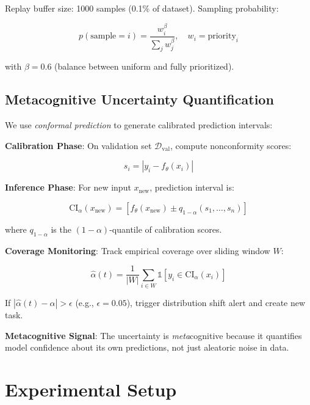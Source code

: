 \documentclass[journal]{IEEEtran}
\begin{document}
Replay buffer size: 1000 samples (0.1\% of dataset). Sampling probability:

\begin{equation}
p(\text{sample} = i) = \frac{w_i^\beta}{\sum_j w_j^\beta}, \quad w_i = \text{priority}_i
\end{equation}

with $\beta = 0.6$ (balance between uniform and fully prioritized).

\subsection{Metacognitive Uncertainty Quantification}

We use \textit{conformal prediction} \cite{shafer2008tutorial} to generate calibrated prediction intervals:

\textbf{Calibration Phase}: On validation set $\mathcal{D}_{\text{val}}$, compute nonconformity scores:

\begin{equation}
s_i = |y_i - f_\theta(x_i)|
\end{equation}

\textbf{Inference Phase}: For new input $x_{\text{new}}$, prediction interval is:

\begin{equation}
\text{CI}_\alpha(x_{\text{new}}) = \left[ f_\theta(x_{\text{new}}) \pm q_{1-\alpha}(s_1, \ldots, s_n) \right]
\end{equation}

where $q_{1-\alpha}$ is the $(1-\alpha)$-quantile of calibration scores.

\textbf{Coverage Monitoring}: Track empirical coverage over sliding window $W$:

\begin{equation}
\hat{\alpha}(t) = \frac{1}{|W|} \sum_{i \in W} \mathbb{1}[y_i \in \text{CI}_\alpha(x_i)]
\end{equation}

If $|\hat{\alpha}(t) - \alpha| > \epsilon$ (e.g., $\epsilon = 0.05$), trigger distribution shift alert and create new task.

\textbf{Metacognitive Signal}: The uncertainty is \textit{meta}cognitive because it quantifies model confidence about its own predictions, not just aleatoric noise in data.

\section{Experimental Setup}
\end{document}
